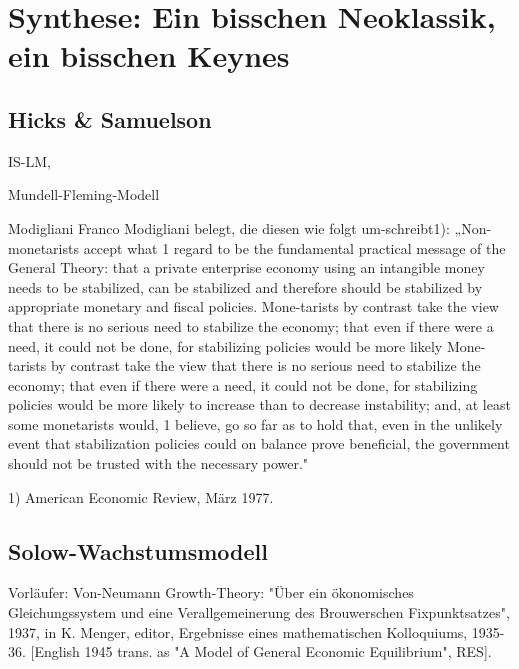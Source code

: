 %
%
%

\chapter{Synthese: Ein bisschen Neoklassik, ein bisschen Keynes}
\label{Synthese}

\section{Hicks \& Samuelson}

IS-LM, 




Mundell-Fleming-Modell


Modigliani
Franco Modigliani belegt, die diesen wie folgt um-schreibt1): „Non-monetarists accept what 1 regard to be the fundamental practical message of the General Theory: that a private enterprise economy using an intangible money needs to be stabilized, can be stabilized and therefore should be stabilized by appropriate monetary and fiscal policies. Mone-tarists by contrast take the view that there is no serious need to stabilize the economy; that even if there were a need, it could not be done, for stabilizing policies would be more likely
Mone-tarists by contrast take the view that there is no serious need to stabilize the economy; that even if there were a need, it could not be done, for stabilizing policies would be more likely to increase than to decrease instability; and, at least some monetarists would, 1 believe, go so far as to hold that, even in the unlikely event that stabilization policies could on balance prove beneficial, the government should not be trusted with the necessary power."

1) American Economic Review, März 1977.






\section{Solow-Wachstumsmodell} \label{sec: Solow-Modell}



Vorläufer: Von-Neumann Growth-Theory: 
"Über ein ökonomisches Gleichungssystem und eine Verallgemeinerung des Brouwerschen Fixpunktsatzes",  1937, in K. Menger, editor, Ergebnisse eines mathematischen Kolloquiums, 1935-36. [English 1945 trans. as "A Model of General Economic Equilibrium", RES].

